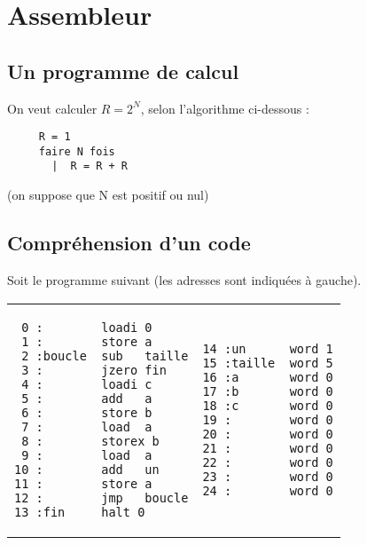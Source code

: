 \section{Assembleur}


\subsection{Un programme de calcul}
On veut calculer $R = 2^N$, selon l'algorithme ci-dessous :
\begin{lstlisting}
     R = 1
     faire N fois
       |  R = R + R
\end{lstlisting}
(on suppose que N est positif ou nul)



\subsection{Compréhension d'un code}
Soit le programme suivant (les adresses sont indiquées à gauche).

\lstset{frame=single}

\begin{tabular}{ll}
\begin{minipage}[t]{0.45\linewidth}
\begin{lstlisting}
 0 :        loadi 0
 1 :        store a
 2 :boucle  sub   taille
 3 :        jzero fin
 4 :        loadi c
 5 :        add   a
 6 :        store b
 7 :        load  a
 8 :        storex b
 9 :        load  a
10 :        add   un
11 :        store a
12 :        jmp   boucle
13 :fin     halt 0   
\end{lstlisting}
\end{minipage}
&
\begin{minipage}[t]{0.45\linewidth}
\begin{lstlisting}
14 :un      word 1
15 :taille  word 5
16 :a       word 0
17 :b       word 0
18 :c       word 0
19 :        word 0
20 :        word 0
21 :        word 0
22 :        word 0
23 :        word 0
24 :        word 0
\end{lstlisting}
\end{minipage}
\end{tabular}

